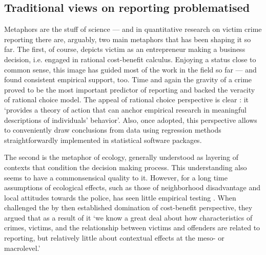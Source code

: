 \documentclass[]{interact}
\theoremstyle{plain}%
\theoremstyle{definition}
\theoremstyle{remark}
\newcommand\citep{\parencite}
\newcommand\citet{\textcite}
\begin{document}
	\subsection*{Traditional views on reporting problematised}
	\label{sec:problem}
	
	Metaphors are the stuff of science \citep{kuhn1979metaphor} --- and in quantitative research on victim crime reporting there are, arguably, two main metaphors that has been shaping it so far. The first, of course, depicts victim as an entrepreneur making a business decision, i.e. engaged in rational cost-benefit calculus. Enjoying a status close to common sense, this image has guided most of the work in the field so far --- and found consistent empirical support, too. Time and again the gravity of a crime proved to be the most important predictor of reporting \citep{gottfredson1979study, laub1981ecological, skogan1984reporting, baumer2002neighborhood, goudriaan2004reporting, tarling2010reporting, schneider1975role} and backed the veracity of rational choice model. The appeal of rational choice perspective is clear \citep{bruch2017decision}: it `provides a theory of action that can anchor empirical research in meaningful descriptions of individuals’ behavior'. Also, once adopted, this perspective allows to conveniently draw conclusions from data using regression methods straightforwardly implemented in statistical software packages.
		 
	The second is the metaphor of ecology, generally understood as layering of contexts that condition the decision making process. 
	This understanding also seems to have a commonsensical quality to it.
	However, for a long time assumptions of ecological effects, such as those of neighborhood disadvantage and local attitudes towards the police, has seen little empirical testing \citep{baumer2002neighborhood, goudriaan2006neighbourhood}. When \citet{goudriaan2004reporting} challenged the by then established domination of cost-benefit perspective, they argued that as a result of it `we know a great deal about how characteristics of crimes, victims, and the relationship between victims and offenders are related to reporting, but relatively little about contextual effects at the meso- or macrolevel.' 
	
\end{document}
